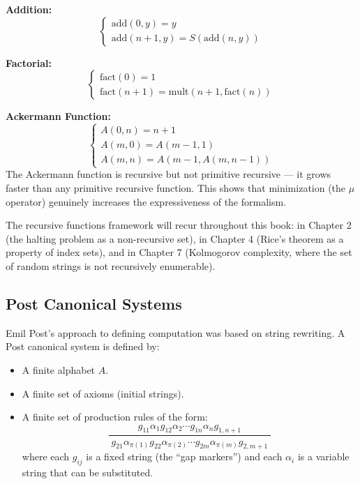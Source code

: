 \begin{example}
\textbf{Addition:}
\[
\begin{cases}
\text{add}(0, y) = y \\
\text{add}(n+1, y) = S(\text{add}(n, y))
\end{cases}
\]

\textbf{Factorial:}
\[
\begin{cases}
\text{fact}(0) = 1 \\
\text{fact}(n+1) = \text{mult}(n+1, \text{fact}(n))
\end{cases}
\]

\textbf{Ackermann Function:}
\[
\begin{cases}
A(0, n) = n + 1 \\
A(m, 0) = A(m-1, 1) \\
A(m, n) = A(m-1, A(m, n-1))
\end{cases}
\]
The Ackermann function is recursive but not primitive recursive --- it grows faster than any primitive recursive function. This shows that minimization (the $\mu$ operator) genuinely increases the expressiveness of the formalism.
\end{example}

The recursive functions framework will recur throughout this book: in Chapter 2 (the halting problem as a non-recursive set), in Chapter 4 (Rice's theorem as a property of index sets), and in Chapter 7 (Kolmogorov complexity, where the set of random strings is not recursively enumerable).

\subsection{Post Canonical Systems}
\label{sec:computation:post}

Emil Post's approach to defining computation was based on string rewriting. A Post canonical system is defined by:
\begin{itemize}
\item A finite alphabet $A$.
\item A finite set of axioms (initial strings).
\item A finite set of production rules of the form:
\[
\frac{g_{11}\alpha_1 g_{12}\alpha_2 \cdots g_{1n}\alpha_n g_{1,n+1}}{\;g_{21}\alpha_{\pi(1)} g_{22}\alpha_{\pi(2)} \cdots g_{2m}\alpha_{\pi(m)} g_{2,m+1}\;}
\]
where each $g_{ij}$ is a fixed string (the ``gap markers'') and each $\alpha_i$ is a variable string that can be substituted.
\end{itemize}

